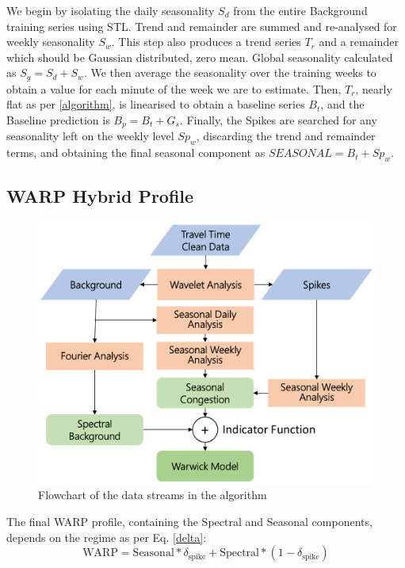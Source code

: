 \documentclass[a4paper, 10pt, conference]{ieeeconf}      %
\begin{document}
We begin by isolating the daily seasonality $S_d$ from the entire Background training series using STL.
Trend and remainder are summed and re-analysed for weekly seasonality $S_w$. This step also produces a trend series $T_r$ and a remainder which should be Gaussian distributed, zero mean.
Global seasonality calculated as $S_g = S_d + S_w$.
We then average the seasonality over the training weeks to obtain a value for each minute of the week we are to estimate.
Then, $T_r$, nearly flat as per \ref{algorithm}, is linearised to obtain a baseline series $B_t$, and the Baseline prediction is $B_p = B_t + G_s$.
Finally, the Spikes are searched for any seasonality left on the weekly level $Sp_w$, discarding the trend and remainder terms, and obtaining the final seasonal component as $\textit{SEASONAL} = B_t + {Sp}_w$.

\subsection{WARP Hybrid Profile}
\begin{figure}[htbp]
	\centerline{\includegraphics[width=\linewidth]{./images/flow_crop.pdf}}
	\caption{Flowchart of the data streams in the algorithm}
	\label{fig:dataflow}
\end{figure}
The final WARP profile, containing the Spectral and Seasonal components, depends on the regime as per Eq. \ref{delta}:
\begin{equation}
\textrm{WARP} = \textrm{Seasonal} * \delta_{\textrm{spike}} + \textrm{Spectral} * (1 - \delta_{\textrm{spike}})
\end{equation}
\end{document}
